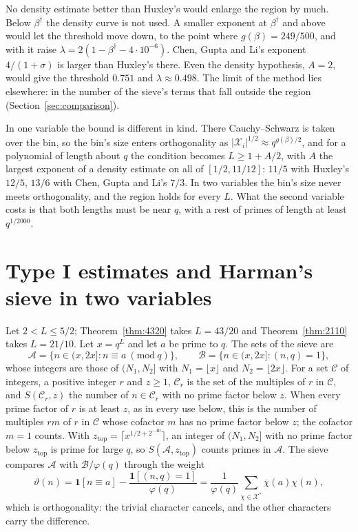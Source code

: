 \documentclass[11pt]{article}
\theoremstyle{definition}
\begin{document}
No density estimate better than Huxley's would enlarge the region by much. Below $\beta^\dagger$ the density curve is
not used. A smaller exponent at $\beta^\dagger$ and above would let the threshold move down, to the point where
$g(\beta) = 249/500$, and with it raise $\lambda = 2(1 - \beta^\dagger - 4 \cdot 10^{-6})$. Chen, Gupta and Li's
exponent $4/(1 + \sigma)$ \cite{cgl} is larger than Huxley's there. Even the density hypothesis, $A = 2$, would give the
threshold $0.751$ and $\lambda \approx 0.498$. The limit of the method lies elsewhere: in the number of the sieve's
terms that fall outside the region (Section~\ref{sec:comparison}).

In one variable the bound is different in kind. There Cauchy--Schwarz is taken over the bin, so the bin's size enters
orthogonality as $|\mathcal X_i|^{1/2} \approx q^{g(\beta)/2}$, and for a polynomial of length about $q$ the condition
becomes $L \ge 1 + A/2$, with $A$ the largest exponent of a density estimate on all of $[1/2, 11/12]$: $11/5$ with
Huxley's $12/5$, $13/6$ with Chen, Gupta and Li's $7/3$. In two variables the bin's size never meets orthogonality,
and the region holds for every
$L$. What the second variable costs is that both lengths must be near $q$, with a rest of primes of length at least
$q^{1/2000}$.

\section{Type I estimates and Harman's sieve in two variables}\label{sec:type1}

Let $2 < L \le 5/2$; Theorem~\ref{thm:4320} takes $L = 43/20$ and Theorem~\ref{thm:2110} takes $L = 21/10$. Let $x =
q^L$ and let $a$ be prime to $q$. The sets of
the sieve are
\[
  \mathcal A = \{n \in (x, 2x] : n \equiv a \ (\mathrm{mod}\ q)\}, \qquad
  \mathcal B = \{n \in (x, 2x] : (n, q) = 1\},
\]
whose integers are those of $(N_1, N_2]$ with $N_1 = \lfloor x \rfloor$ and $N_2 = \lfloor 2x \rfloor$.
For a set $\mathcal C$ of integers, a positive integer $r$ and $z \ge 1$, $\mathcal C_r$ is the set of the multiples of
$r$ in $\mathcal C$, and $S(\mathcal C_r, z)$ the number of $n \in \mathcal C_r$ with no prime factor below $z$. When
every prime factor of $r$ is at least $z$, as in every use below, this is the number of multiples $rm$ of $r$ in
$\mathcal C$ whose cofactor $m$ has no prime factor below $z$; the cofactor $m = 1$ counts. With
$z_{\mathrm{top}} = \lceil x^{1/2 + 2^{-40}} \rceil$, an integer of $(N_1, N_2]$ with no prime factor below
$z_{\mathrm{top}}$ is prime for large $q$, so $S(\mathcal A, z_{\mathrm{top}})$ counts primes in $\mathcal A$. The sieve
compares $\mathcal A$ with $\mathcal B/\varphi(q)$ through the weight
\[
  \vartheta(n) = \mathbf 1[n \equiv a] - \frac{\mathbf 1[(n, q) = 1]}{\varphi(q)}
  = \frac1{\varphi(q)} \sum_{\chi \in \mathcal X^*} \overline\chi(a) \chi(n),
\]
which is orthogonality: the trivial character cancels, and the other characters carry the difference.
\end{document}
